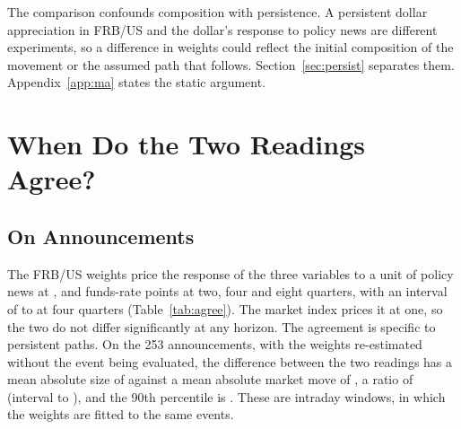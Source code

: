 \documentclass[11pt]{article}
\begin{document}


The comparison confounds composition with persistence. A persistent dollar appreciation in FRB/US and the dollar's response to policy news are different experiments, so a difference in weights could reflect the initial composition of the movement or the assumed path that follows. Section~\ref{sec:persist} separates them. Appendix~\ref{app:ma} states the static argument.
\FloatBarrier

\section{When Do the Two Readings Agree?}\label{sec:agree}
\subsection{On Announcements}\label{sec:onannounce}
The FRB/US weights price the response of the three variables to a unit of policy news at ,  and  funds-rate points at two, four and eight quarters, with an interval of  to  at four quarters (Table~\ref{tab:agree}). The market index prices it at one, so the two do not differ significantly at any horizon. The agreement is specific to persistent paths. On the 253 announcements, with the weights re-estimated without the event being evaluated, the difference between the two readings has a mean absolute size of  against a mean absolute market move of , a ratio of  (interval  to ), and the 90th percentile is . These are intraday windows, in which the weights are fitted to the same events.


\end{document}
